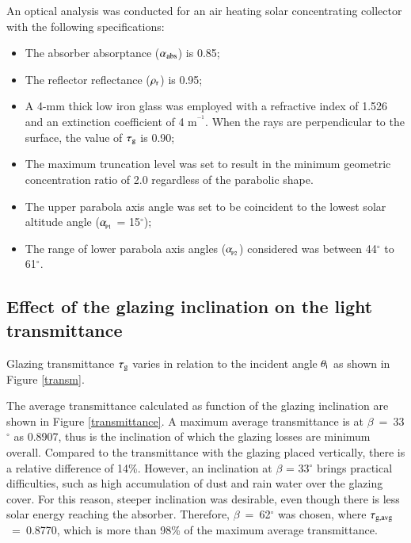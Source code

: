 
An optical analysis was conducted for an air heating solar concentrating collector with the following specifications: 

\begin{itemize} [topsep=5pt,partopsep=0pt] \itemsep0pt
    \item The absorber absorptance ($\alpha_{\rm{abs}}$) is 0.85;
    \item The reflector reflectance ($\rho_{\rm{r}}$) is 0.95;
    \item A 4-mm thick low iron glass was employed with a refractive index of 1.526 and an extinction coefficient of 4 m$^{\!^{-1}}$. When the rays are perpendicular to the surface, the value of $\tau_{\rm{g}}$ is 0.90;
    \item The maximum truncation level was set to result in the minimum geometric concentration ratio of 2.0 regardless of the parabolic shape.
    \item The upper parabola axis angle was set to be coincident to the lowest solar altitude angle ($\alpha_{\!_{\rm{P1}}}$ = 15$^{\circ}$);
    \item The range of lower parabola axis angles ($\alpha_{\!_{\rm{P2}}}$) considered was between 44$^{\circ}$ to 61$^{\circ}$.
\end{itemize}

\subsection{Effect of the glazing inclination on the light transmittance}

Glazing transmittance $\tau_{\rm{g}}$ varies in relation to the incident angle $\theta_{\rm{i}}$ as shown in Figure \ref{transm}.


The average transmittance calculated as function of the glazing inclination are shown in Figure \ref{transmittance}. A maximum average transmittance is at \mbox{$\beta$ = 33$^{\circ}$} as 0.8907, thus is the inclination of which the glazing losses are minimum overall. Compared to the transmittance with the glazing placed vertically, there is a relative difference of 14\%. However, an inclination at $\beta$ = 33$^{\circ}$ brings practical difficulties, such as high accumulation of dust and rain water over the glazing cover. For this reason, steeper inclination was desirable, even though there is less solar energy reaching the absorber. Therefore, \mbox{$\beta$ = 62$^{\circ}$} was chosen, where \mbox{$\tau_{\rm{g,avg}}$ = 0.8770}, which is more than 98\% of the maximum average transmittance.

